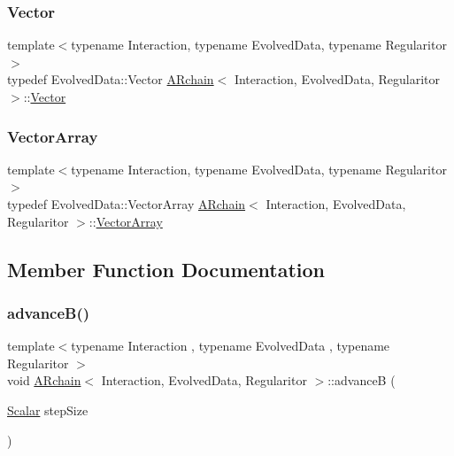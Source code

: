 \mbox{\label{class_a_rchain_ab9b518a463f750eb54e002842b66e8dd}} 
\subsubsection{\texorpdfstring{Vector}{Vector}}
{\footnotesize\ttfamily template$<$typename Interaction, typename Evolved\+Data, typename Regularitor$>$ \\
typedef Evolved\+Data\+::\+Vector \mbox{\hyperlink{class_a_rchain}{A\+Rchain}}$<$ Interaction, Evolved\+Data, Regularitor $>$\+::\mbox{\hyperlink{class_a_rchain_ab9b518a463f750eb54e002842b66e8dd}{Vector}}}

\mbox{\label{class_a_rchain_a019fbadb9f4e5892736d9127537338bb}} 
\subsubsection{\texorpdfstring{Vector\+Array}{VectorArray}}
{\footnotesize\ttfamily template$<$typename Interaction, typename Evolved\+Data, typename Regularitor$>$ \\
typedef Evolved\+Data\+::\+Vector\+Array \mbox{\hyperlink{class_a_rchain}{A\+Rchain}}$<$ Interaction, Evolved\+Data, Regularitor $>$\+::\mbox{\hyperlink{class_a_rchain_a019fbadb9f4e5892736d9127537338bb}{Vector\+Array}}}



\subsection{Member Function Documentation}
\mbox{\label{class_a_rchain_a1b2ae6231caeba3df20e4ab41f63a4b8}} 
\subsubsection{\texorpdfstring{advance\+B()}{advanceB()}}
{\footnotesize\ttfamily template$<$typename Interaction , typename Evolved\+Data , typename Regularitor $>$ \\
void \mbox{\hyperlink{class_a_rchain}{A\+Rchain}}$<$ Interaction, Evolved\+Data, Regularitor $>$\+::advanceB (\begin{DoxyParamCaption}\item[{\mbox{\hyperlink{class_a_rchain_a707e42a79e4744424a34c9007e84ee07}{Scalar}}}]{step\+Size }\end{DoxyParamCaption})\hspace{0.3cm}{\ttfamily [private]}}

